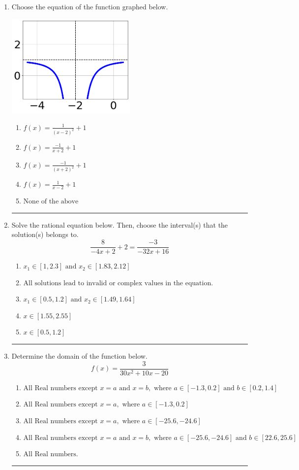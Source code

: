 \documentclass[14pt]{extbook}
\newcommand{\litem}[1]{\item#1\hspace*{-1cm}\rule{\textwidth}{0.4pt}}
\begin{document}
\begin{enumerate}
\litem{
Choose the equation of the function graphed below.
\begin{center}
    \includegraphics[width=0.5\textwidth]{../Figures/rationalGraphToEquationCopyC.png}
\end{center}
\begin{enumerate}[label=\Alph*.]
\item \( f(x) = \frac{1}{(x - 2)^2} + 1 \)
\item \( f(x) = \frac{-1}{x + 2} + 1 \)
\item \( f(x) = \frac{-1}{(x + 2)^2} + 1 \)
\item \( f(x) = \frac{1}{x - 2} + 1 \)
\item \( \text{None of the above} \)

\end{enumerate} }
\litem{
Solve the rational equation below. Then, choose the interval(s) that the solution(s) belongs to.\[ \frac{8}{-4x + 2} + 2 = \frac{-3}{-32x + 16} \]\begin{enumerate}[label=\Alph*.]
\item \( x_1 \in [1, 2.3] \text{ and } x_2 \in [1.83,2.12] \)
\item \( \text{All solutions lead to invalid or complex values in the equation.} \)
\item \( x_1 \in [0.5, 1.2] \text{ and } x_2 \in [1.49,1.64] \)
\item \( x \in [1.55,2.55] \)
\item \( x \in [0.5,1.2] \)

\end{enumerate} }
\litem{
Determine the domain of the function below.\[ f(x) = \frac{3}{30x^{2} +10 x -20} \]\begin{enumerate}[label=\Alph*.]
\item \( \text{All Real numbers except } x = a \text{ and } x = b, \text{ where } a \in [-1.3, 0.2] \text{ and } b \in [0.2, 1.4] \)
\item \( \text{All Real numbers except } x = a, \text{ where } a \in [-1.3, 0.2] \)
\item \( \text{All Real numbers except } x = a, \text{ where } a \in [-25.6, -24.6] \)
\item \( \text{All Real numbers except } x = a \text{ and } x = b, \text{ where } a \in [-25.6, -24.6] \text{ and } b \in [22.6, 25.6] \)
\item \( \text{All Real numbers.} \)


\end{enumerate}}
\end{enumerate}
\end{document}
